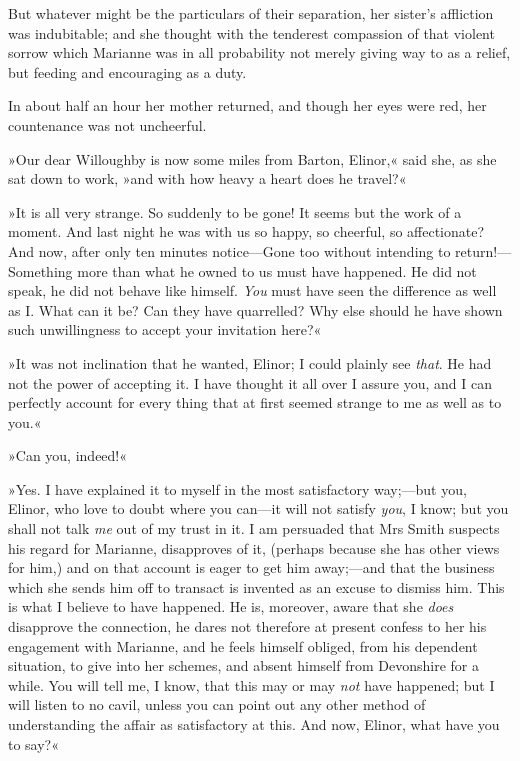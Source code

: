 But whatever might be the particulars of their separation, her sister’s affliction was indubitable; and she thought with the tenderest compassion of that violent sorrow which Marianne was in all probability not merely giving way to as a relief, but feeding and encouraging as a duty.

In about half an hour her mother returned, and though her eyes were red, her countenance was not uncheerful.

»Our dear Willoughby is now some miles from Barton, Elinor,« said she, as she sat down to work, »and with how heavy a heart does he travel?«

»It is all very strange. So suddenly to be gone! It seems but the work of a moment. And last night he was with us so happy, so cheerful, so affectionate? And now, after only ten minutes notice—Gone too without intending to return!—Something more than what he owned to us must have happened. He did not speak, he did not behave like himself. \textit{You} must have seen the difference as well as I. What can it be? Can they have quarrelled? Why else should he have shown such unwillingness to accept your invitation here?«

»It was not inclination that he wanted, Elinor; I could plainly see \textit{that}. He had not the power of accepting it. I have thought it all over I assure you, and I can perfectly account for every thing that at first seemed strange to me as well as to you.«

»Can you, indeed!«

»Yes. I have explained it to myself in the most satisfactory way;—but you, Elinor, who love to doubt where you can—it will not satisfy \textit{you}, I know; but you shall not talk \textit{me} out of my trust in it. I am persuaded that Mrs Smith suspects his regard for Marianne, disapproves of it, (perhaps because she has other views for him,) and on that account is eager to get him away;—and that the business which she sends him off to transact is invented as an excuse to dismiss him. This is what I believe to have happened. He is, moreover, aware that she \textit{does} disapprove the connection, he dares not therefore at present confess to her his engagement with Marianne, and he feels himself obliged, from his dependent situation, to give into her schemes, and absent himself from Devonshire for a while. You will tell me, I know, that this may or may \textit{not} have happened; but I will listen to no cavil, unless you can point out any other method of understanding the affair as satisfactory at this. And now, Elinor, what have you to say?«

